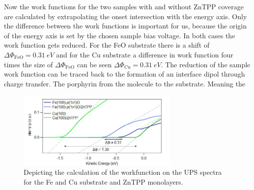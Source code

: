 Now the work functions for the two samples with and without ZnTPP coverage are calculated by extrapolating the onset intersection with the energy axis. Only the difference between the work functions is important for us, because the origin of the energy axis is set by the chosen sample bias voltage.
In both cases the work function gets reduced. 
For the FeO substrate there is a shift of $\Delta\Phi_{\mathrm{FeO}} = \qty{0.31}{eV}$ and for the Cu substrate a difference in work function four times the size of $\Delta\Phi_{\mathrm{FeO}}$ can be seen $\Delta\Phi_{\mathrm{Cu}} = \qty{0.31}{eV}$.
The reduction of the sample work function can be traced back to the formation of an interface dipol through charge transfer.
The porphyrin from the molecule to the substrate.
Meaning the 
\begin{figure}[h]
    \centering
    \includegraphics[width = 0.7\textwidth]{Plots/WF.png}
    \caption{Depicting the calculation of the workfunction on the UPS spectra for the Fe and Cu substrate and ZnTPP monolayers.}
    \label{fig:wf}
\end{figure}
\FloatBarrier
